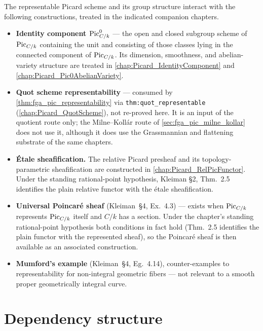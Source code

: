 The representable Picard scheme and its group structure interact with the
following constructions, treated in the indicated companion chapters.
\begin{itemize}
  \item \textbf{Identity component \(\operatorname{Pic}^0_{C/k}\)} --- the open and
    closed subgroup scheme of \(\operatorname{Pic}_{C/k}\) containing the unit and
    consisting of those classes lying in the connected component of
    \(\operatorname{Pic}_{C/k}\). Its dimension, smoothness, and abelian-variety
    structure are treated in \cref{chap:Picard_IdentityComponent} and
    \cref{chap:Picard_Pic0AbelianVariety}.
  \item \textbf{Quot scheme representability} --- consumed by
    \cref{thm:fga_pic_representability} via \texttt{thm:quot\_representable}
    (\cref{chap:Picard_QuotScheme}), not re-proved here. It is an input of the
    quotient route only; the Milne--Koll\'ar route of
    \cref{sec:fga_pic_milne_kollar} does not use it, although it does use the
    Grassmannian and flattening substrate of the same chapters.
  \item \textbf{\'Etale sheafification.} The relative Picard presheaf and its
    topology-parametric sheafification are constructed in
    \cref{chap:Picard_RelPicFunctor}. Under the
    standing rational-point hypothesis, Kleiman \S 2, Thm.~2.5 identifies
    the plain relative functor with the \'etale sheafification.
  \item \textbf{Universal Poincar\'e sheaf} (Kleiman~\S 4, Ex.~4.3)
    --- exists when \(\operatorname{Pic}_{C/k}\) represents \(\operatorname{Pic}_{C/k}\) itself and
    \(C/k\) has a section. Under the chapter's standing rational-point
    hypothesis both conditions in fact hold (Thm.~2.5 identifies the
    plain functor with the represented sheaf), so the Poincar\'e sheaf
    is then available as an associated construction.
  \item \textbf{Mumford's example} (Kleiman~\S 4, Eg.~4.14), counter-examples
    to representability for non-integral geometric fibers --- not
    relevant to a smooth proper geometrically integral curve.
\end{itemize}

\section{Dependency structure}
\label{sec:fga_pic_consistency_check}

